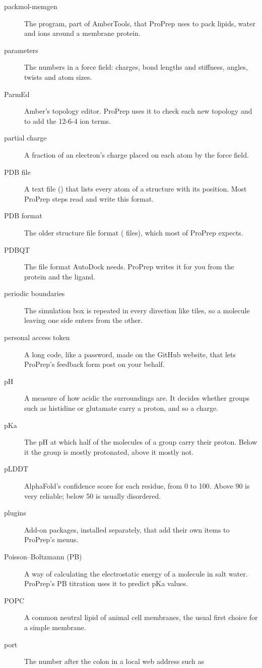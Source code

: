 \begin{description}
\item[packmol-memgen] The program, part of AmberTools, that ProPrep uses to
  pack lipids, water and ions around a membrane protein.
\item[parameters] The numbers in a force field: charges, bond lengths and
  stiffness, angles, twists and atom sizes.
\item[ParmEd] Amber's topology editor. ProPrep uses it to check each new
  topology and to add the 12-6-4 ion terms.
\item[partial charge] A fraction of an electron's charge placed on each atom
  by the force field.
\item[PDB file] A text file () that lists every atom of a structure
  with its position. Most ProPrep steps read and write this format.
\item[PDB format] The older structure file format ( files), which
  most of ProPrep expects.
\item[PDBQT] The file format AutoDock needs. ProPrep writes it for you from
  the protein and the ligand.
\item[periodic boundaries] The simulation box is repeated in every direction
  like tiles, so a molecule leaving one side enters from the other.
\item[personal access token] A long code, like a password, made on the GitHub
  website, that lets ProPrep's feedback form post on your behalf.
\item[pH] A measure of how acidic the surroundings are. It decides whether
  groups such as histidine or glutamate carry a proton, and so a charge.
\item[pKa] The pH at which half of the molecules of a group carry their
  proton. Below it the group is mostly protonated, above it mostly not.
\item[pLDDT] AlphaFold's confidence score for each residue, from 0 to 100.
  Above 90 is very reliable; below 50 is usually disordered.
\item[plugins] Add-on packages, installed separately, that add their own items
  to ProPrep's menus.
\item[Poisson--Boltzmann (PB)] A way of calculating the electrostatic energy of
  a molecule in salt water. ProPrep's PB titration uses it to predict pKa
  values.
\item[POPC] A common neutral lipid of animal cell membranes, the usual first
  choice for a simple membrane.
\item[port] The number after the colon in a local web address such as

\end{description}
